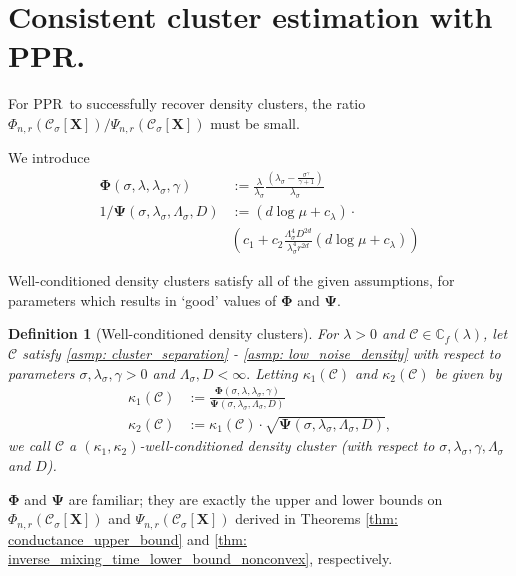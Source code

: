 \documentclass{article}
\newcommand{\1}{\mathbf{1}}
\newcommand{\Phibf}{\mathbf{\Phi}}
\newcommand{\Psibf}{\mathbf{\Psi}}
\newcommand{\Xbf}{\mathbf{X}}
\newcommand{\Cbb}{\mathbb{C}}
\newcommand{\Cset}{\mathcal{C}}
\newcommand{\Csig}{\Cset_{\sigma}}
\newcommand{\pprspace}{{\sc PPR~}}
\theoremstyle{aldenthm}
\newtheorem{definition}{Definition}
\theoremstyle{aldenrmrk}
\begin{document}
\section{Consistent cluster estimation with PPR.}
\label{sec: consistent_cluster_estimation_with_ppr}

For \pprspace to successfully recover density clusters, the ratio $\Phi_{n,r}(\Csig[\Xbf])/\Psi_{n,r}(\Csig[\Xbf])$ must be small. 

We introduce
\begin{align*}
\mathbf{\Phi}(\sigma, \lambda,\lambda_{\sigma},\gamma) & := \frac{\lambda}{\lambda_{\sigma}} \frac{(\lambda_{\sigma} - \frac{\sigma^{\gamma}}{\gamma+1})}{\lambda_{\sigma}} \\
1 / \mathbf{\Psi}(\sigma, \lambda_{\sigma}, \Lambda_{\sigma}, D) & := \left(d \log \mu + c_{\lambda} \right) \cdot \nonumber \\ 
& \left(c_1 + c_2 \frac{\Lambda_{\sigma}^4D^{2d}}{\lambda_{\sigma}^4r^{2d}}\left(d \log \mu + c_{\lambda}\right)\right)
\end{align*}

Well-conditioned density clusters satisfy all of the given assumptions, for parameters which results in `good' values of $\Phibf$ and $\Psibf$.
\begin{definition}[Well-conditioned density clusters]
	For $\lambda > 0$ and $\Cset \in \Cbb_f(\lambda)$, let $\Cset$ satisfy \ref{asmp: cluster_separation} - \ref{asmp: low_noise_density} with respect to parameters $\sigma, \lambda_{\sigma}, \gamma > 0$ and $\Lambda_{\sigma}, D < \infty.$ Letting $\kappa_1(\Cset)$ and $\kappa_2(\Cset)$ be given by
	\begin{align*}
	\kappa_1(\Cset) & := \frac{\mathbf{\Phi}(\sigma, \lambda,\lambda_{\sigma},\gamma)}{\mathbf{\Psi}(\sigma, \lambda_{\sigma}, \Lambda_{\sigma}, D)} \\
	\kappa_2(\Cset) & := \kappa_1(\Cset) \cdot \sqrt{\mathbf{\Psi}(\sigma, \lambda_{\sigma}, \Lambda_{\sigma}, D)},
	\end{align*}
	we call $\Cset$ a \textrm{$(\kappa_1, \kappa_2)$-well-conditioned density cluster (with respect to $\sigma, \lambda_{\sigma}, \gamma, \Lambda_{\sigma}$ and $D$).}
\end{definition}

$\Phibf$ and $\Psibf$ are familiar; they are exactly the upper and lower bounds on $\Phi_{n,r}(\Csig[\Xbf])$ and $\Psi_{n,r}(\Csig[\Xbf])$ derived in Theorems \ref{thm: conductance_upper_bound} and \ref{thm: inverse_mixing_time_lower_bound_nonconvex}, respectively.
\end{document}
